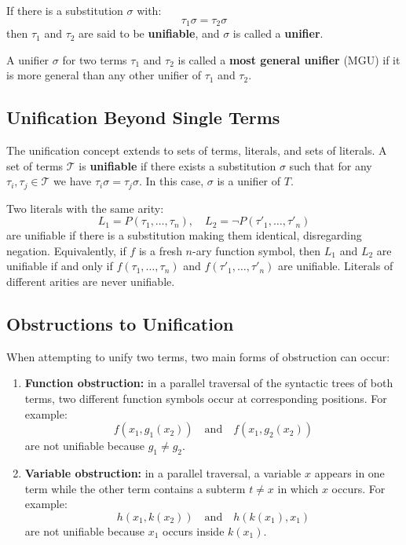 If there is a substitution \(\sigma\) with:
\begin{equation}
\tau_1\sigma = \tau_2\sigma
\end{equation}
then \(\tau_1\) and \(\tau_2\) are said to be \textbf{unifiable}, and \(\sigma\) is called a \textbf{unifier}.

A unifier \(\sigma\) for two terms \(\tau_1\) and \(\tau_2\) is called a \textbf{most general unifier} (MGU) if it is more general than any other unifier of \(\tau_1\) and \(\tau_2\).

\subsection{Unification Beyond Single Terms}
The unification concept extends to sets of terms, literals, and sets of literals.  
A set of terms \(\mathcal{T}\) is \textbf{unifiable} if there exists a substitution \(\sigma\) such that for any \(\tau_i, \tau_j \in \mathcal{T}\) we have \(\tau_i\sigma = \tau_j\sigma\). In this case, \(\sigma\) is a unifier of \(T\).

Two literals with the same arity:
\begin{equation}
L_1 = P(\tau_1, \ldots, \tau_n), \quad L_2 = \neg P(\tau'_1, \ldots, \tau'_n)
\end{equation}
are unifiable if there is a substitution making them identical, disregarding negation. Equivalently, if \(f\) is a fresh \(n\)-ary function symbol, then \(L_1\) and \(L_2\) are unifiable if and only if \(f(\tau_1, \ldots, \tau_n)\) and \(f(\tau'_1, \ldots, \tau'_n)\) are unifiable.  
Literals of different arities are never unifiable.

\subsection{Obstructions to Unification}
When attempting to unify two terms, two main forms of obstruction can occur:
\begin{enumerate}
    \item \textbf{Function obstruction:} in a parallel traversal of the syntactic trees of both terms, two different function symbols occur at corresponding positions. For example:
    \[
    f(x_1, g_1(x_2)) \quad\text{and}\quad f(x_1, g_2(x_2))
    \]
    are not unifiable because \(g_1 \neq g_2\).
    \item \textbf{Variable obstruction:} in a parallel traversal, a variable \(x\) appears in one term while the other term contains a subterm \(t \neq x\) in which \(x\) occurs. For example:
    \[
    h(x_1, k(x_2)) \quad\text{and}\quad h(k(x_1), x_1)
    \]
    are not unifiable because \(x_1\) occurs inside \(k(x_1)\).
\end{enumerate}


